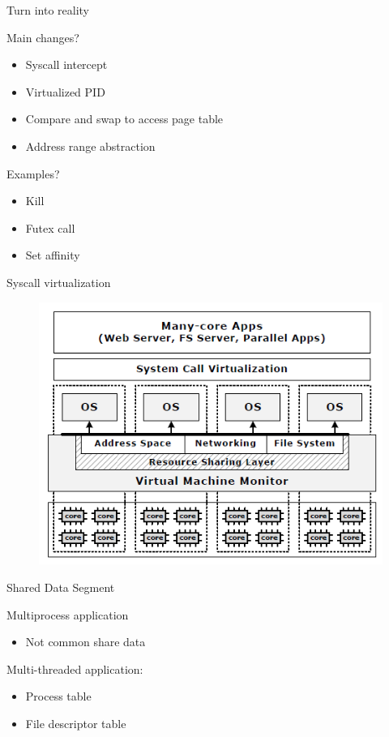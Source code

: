 \documentclass{beamer}
\begin{document}
	\begin{frame}{Turn into reality}

	Main changes?	
	\begin{itemize}
	\item Syscall intercept	
	\item Virtualized PID
	\item Compare and swap to access page table
	\item Address range abstraction
	\end{itemize}
	
	Examples?
	\begin{itemize}
	\item Kill
	\item Futex call
	\item Set affinity
	\end{itemize}	
	
	\end{frame}

	\begin{frame}{Syscall virtualization}
	
		\begin{figure} [H]
			\centering
			\includegraphics[scale=0.40]{img/syscall-virtualization}
		\end{figure}	

	\end{frame}
	
	\begin{frame}{Shared Data Segment}
	
	Multiprocess application	
	
	\begin{itemize}	
		\item Not common share data
	\end{itemize}	
	
	Multi-threaded application:
	
	\begin{itemize}		
	\item Process table
	\item File descriptor table
	\end{itemize}
	
	\end{frame}
\end{document}

